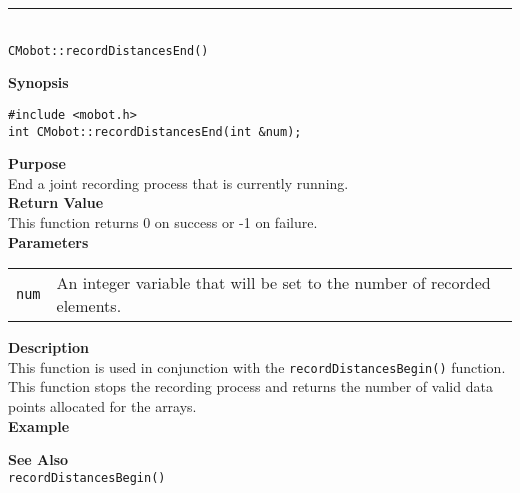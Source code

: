 \noindent
\vspace{5pt}
\rule{4.5in}{0.015in}\\
\noindent
{\LARGE \texttt{CMobot::recordDistancesEnd()}}\\
{}

\noindent
{\bf Synopsis}
\vspace{-8pt}
\begin{verbatim}
#include <mobot.h>
int CMobot::recordDistancesEnd(int &num);
\end{verbatim}

\noindent
{\bf Purpose}\\
End a joint recording process that is currently running.\\

\noindent
{\bf Return Value}\\
This function returns 0 on success or -1 on failure.\\

\noindent
{\bf Parameters}\\
\vspace{-0.1in}
\begin{description}
\item               
\begin{tabular}{p{15 mm}p{145 mm}}
\texttt{num} & An integer variable that will be set to the number of recorded elements. \\
\end{tabular}
\end{description}

\noindent
{\bf Description}\\
This function is used in conjunction with the \texttt{recordDistancesBegin()} function. 
This function stops the recording process and returns the number of valid data points
allocated for the arrays.\\

\noindent
{\bf Example}\\
\noindent

\noindent
{\bf See Also}\\
\texttt{recordDistancesBegin()} \\
